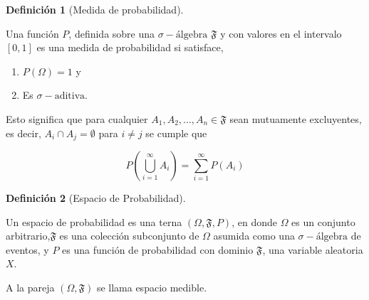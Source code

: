 \documentclass[
  us-letterpaper,
]{scrreprt}
\theoremstyle{plain}
\theoremstyle{definition}
\newtheorem{definition}{Definición}[chapter]
\theoremstyle{definition}
\theoremstyle{remark}
\begin{document}
\begin{definition}[Medida de
probabilidad]\protect\hypertarget{def-medP}{}\label{def-medP}

Una función \(P\), definida sobre una \(\sigma-\text{álgebra}\)
\(\mathfrak{F}\) y con valores en el intervalo \([0, 1]\) es una medida
de probabilidad si satisface,

\begin{enumerate}
\def\labelenumi{\arabic{enumi}.}
\item
  \(P(\Omega) = 1\) y
\item
  Es \(\sigma-\text{aditiva}\).
\end{enumerate}

\end{definition}

Esto significa que para cualquier
\(A_1,A_2, \dots , A_n \in \mathfrak{F}\) sean mutuamente excluyentes,
es decir, \(A_i ∩ A_j = \emptyset\) para \(i \neq j\) se cumple que

\[
\displaystyle P \left( \bigcup_{i=1}^{\infty} A_i \right) = \displaystyle   \sum_{i=1}^{\infty} P (A_i)
\]

\begin{definition}[Espacio de
Probabilidad]\protect\hypertarget{def-espacioP}{}\label{def-espacioP}

Un espacio de probabilidad es una terna \((\Omega, \mathfrak{F}, P)\),
en donde \(\Omega\) es un conjunto arbitrario,\(\mathfrak{F}\) es una
colección subconjunto de \(\Omega\) asumida como una
\(\sigma-\text{álgebra}\) de eventos, y \(P\) es una función de
probabilidad con dominio \(\mathfrak{F}\), una variable aleatoria \(X\).

A la pareja \((\Omega, \mathfrak{F})\) se llama espacio medible.

\end{definition}
\end{document}
